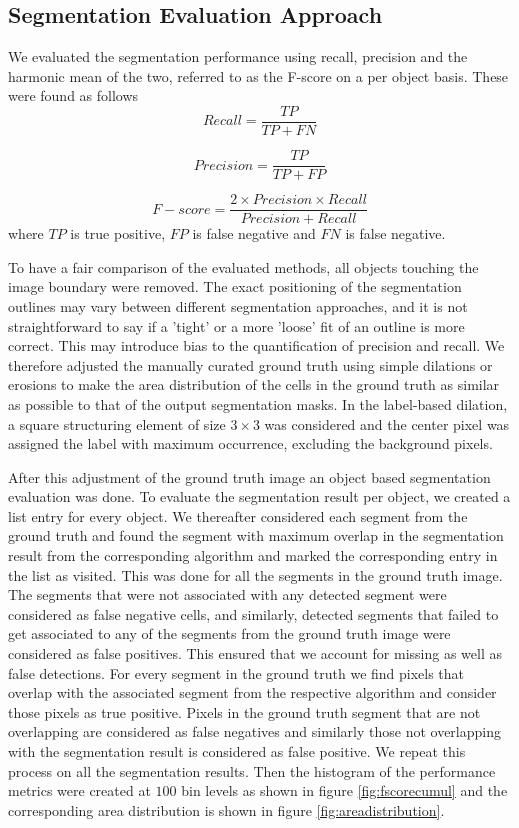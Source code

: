 \documentclass[journal]{IEEEtran}
\begin{document}
\subsection{Segmentation Evaluation Approach}

We evaluated the segmentation performance using recall, precision and the harmonic mean of the two, referred to as the F-score on a per object basis. These were found as follows\begin{equation*}
Recall = \frac{TP}{TP + FN}
\end{equation*}

\begin{equation*}
Precision = \frac{TP}{TP + FP}
\end{equation*}

\begin{equation*}
F-score = \frac{2\times Precision \times Recall}{Precision + Recall}
\end{equation*}
where $TP$ is true positive, $FP$ is false negative and $FN$ is false negative.

To have a fair comparison of the evaluated methods, all objects touching the image boundary were removed. The exact positioning of the segmentation outlines may vary between different segmentation approaches, and it is not straightforward to say if a 'tight' or a more 'loose' fit of an outline is more correct. This may introduce bias to the quantification of precision and recall. We therefore adjusted the manually curated ground truth using simple dilations or erosions to make the area distribution of the cells in the ground truth as similar as possible to that of the output segmentation masks. In the label-based dilation, a square structuring element of size $3 \times 3$ was considered and the center pixel was assigned the label with maximum occurrence, excluding the background pixels. 

After this adjustment of the ground truth image an object based segmentation evaluation was done. To evaluate the segmentation result per object, we created a list entry for every object. We thereafter considered each segment from the ground truth and found the segment with maximum overlap in the segmentation result from the corresponding algorithm and marked the corresponding entry in the list as visited. This was done for all the segments in the ground truth image. The segments that were not associated with any detected segment were considered as false negative cells, and similarly, detected segments that failed to get associated to any of the segments from the ground truth image were considered as false positives. This ensured that we account for missing as well as false detections. For every segment in the ground truth we find pixels that overlap with the associated segment from the respective algorithm and consider those pixels as true positive. Pixels in the ground truth segment that are not overlapping are considered as false negatives and similarly those not overlapping with the segmentation result is considered as false positive. We repeat this process on all the segmentation results. Then the histogram of the performance metrics were created at $100$ bin levels as shown in figure \ref{fig:fscorecumul} and the corresponding area distribution is shown in figure \ref{fig:areadistribution}.
\end{document}
